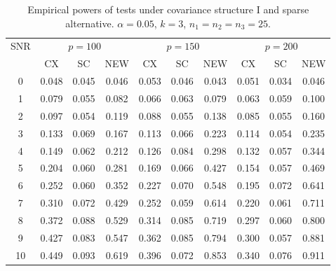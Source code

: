 \documentclass[12pt]{article} %
\theoremstyle{definition}
\begin{document}
\begin{table}[!hbp]
    \caption{Empirical powers of tests under covariance structure I and sparse alternative. $\alpha=0.05$, $k=3$, $n_1=n_2=n_3=25$. }
    \label{table4}
    \centering
\begin{tabular}{*{10}{c}}
\toprule
\multirow{2}{*}{SNR} &\multicolumn{3}{c}{$p=100$}&\multicolumn{3}{c}{$p=150$}&\multicolumn{3}{c}{$p=200$} \\
    \cmidrule(r){2-4}\cmidrule(r){5-7}\cmidrule(r){8-10}
        & CX & SC & NEW & CX &SC &NEW &CX & SC & NEW\\
\midrule
0 & 0.048 & 0.045 & 0.046 & 0.053 & 0.046 & 0.043 & 0.051 & 0.034 & 0.046 \\ 
1 & 0.079 & 0.055 & 0.082 & 0.066 & 0.063 & 0.079 & 0.063 & 0.059 & 0.100 \\ 
2 & 0.097 & 0.054 & 0.119 & 0.088 & 0.055 & 0.138 & 0.085 & 0.055 & 0.160 \\ 
3 & 0.133 & 0.069 & 0.167 & 0.113 & 0.066 & 0.223 & 0.114 & 0.054 & 0.235 \\ 
4 & 0.149 & 0.062 & 0.212 & 0.126 & 0.084 & 0.298 & 0.132 & 0.057 & 0.344 \\ 
5 & 0.204 & 0.060 & 0.281 & 0.169 & 0.066 & 0.427 & 0.154 & 0.057 & 0.469 \\ 
6 & 0.252 & 0.060 & 0.352 & 0.227 & 0.070 & 0.548 & 0.195 & 0.072 & 0.641 \\ 
7 & 0.310 & 0.072 & 0.429 & 0.252 & 0.059 & 0.614 & 0.220 & 0.061 & 0.711 \\ 
8 & 0.372 & 0.088 & 0.529 & 0.314 & 0.085 & 0.719 & 0.297 & 0.060 & 0.800 \\ 
9 & 0.427 & 0.083 & 0.547 & 0.362 & 0.085 & 0.794 & 0.300 & 0.057 & 0.881 \\ 
10 & 0.449 & 0.093 & 0.619 & 0.396 & 0.072 & 0.853 & 0.340 & 0.076 & 0.911 \\ 
\bottomrule
\end{tabular}
\end{table}
\end{document}
